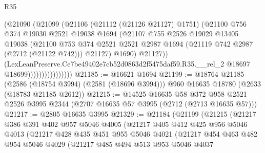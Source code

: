\begin{lexlean}{R35}
\begin{coremodule}
                              (@21090
                                (@21099
                                  (@21106
                                    (@21112 (@21126 @21127) @1751)
                                    (@21100
                                      @756
                                      @374
                                      @19030
                                      @2521
                                      @19038
                                      @1694
                                      (@21107
                                        @755
                                        @2526
                                        @19029
                                        @13405
                                        @19038
                                        (@21100
                                          @753
                                          @374
                                          @2521
                                          @2521
                                          @2987
                                          @1694
                                          (@21119 @742 @2987 (@2712 (@21122 @742)))
                                          @21127)
                                        @1690)
                                      @21127))
                                  (LexLeanPreserve.Ce7be49402e7cb52d0863d2f5475daf59.R35.__rel_2
                                    @18697
                                    @18699))))))))))))))))
@21185 := @16621 @1694
@21199 := @18764
    @21185
    (@2586 (@18754 @3994) (@2581 (@18696 @3994)))
    @960
    @16635
    @18780
    (@2633 (@18783 @21185 @2612))
@21215 := @14525
    @16635
    @58
    @372
    @958
    @2521
    @2526
    @3995
    @2344
    (@2707 @16635 @57 @3995 (@2712 (@2713 @16635 @57)))
@21217 := @2805 @16635 @3995
@21329 := @21184
    (@21199
      (@21215
        (@21217
          @386
          @391
          @402
          @957
          @5046
          @4005
          (@21217
            @405
            @412
            @425
            @956
            @5046
            @4013
            (@21217
              @428
              @435
              @451
              @955
              @5046
              @4021
              (@21217
                @454
                @463
                @482
                @954
                @5046
                @4029
                (@21217
                  @485
                  @494
                  @513
                  @953
                  @5046
                  @4037

\end{coremodule}
\end{lexlean}
